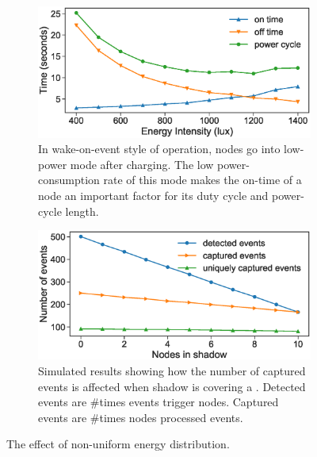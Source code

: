 \begin{figure}
    \begin{subfigure}{0.48\columnwidth}
        \includegraphics[width=\textwidth]{figures/BatterylessNodesDutyCycles_Sleep_mode}
        \caption{In wake-on-event style of operation, nodes go into low-power
	mode after charging. The low power-consumption rate of this mode makes
	the on-time of a node an important factor for its duty cycle and
	power-cycle length.}
        \label{fig:differentEnergyIntensity}
    \end{subfigure}\hfill
    \begin{subfigure}{0.48\columnwidth}
        \includegraphics[width=\textwidth]{figures/different_energy_intensity}
        \caption{Simulated results showing how the number of captured events is affected when shadow is covering a \cis. Detected events are \#times events trigger nodes. Captured events are \#times nodes processed events.}
        \label{fig:sim:differentEnergyIntensity}
    \end{subfigure}
    \vspace{-0.3cm}
    \caption{The effect of non-uniform energy distribution.}
    \label{fig:pwrCycleVSEnergyIntensity}
\end{figure}
